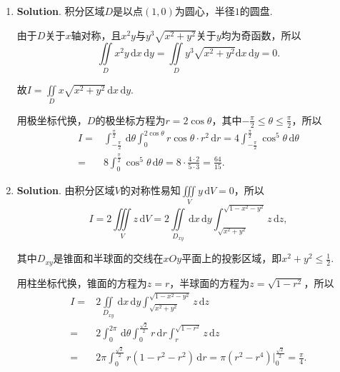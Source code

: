 \documentclass[../main.tex]{subfiles}
\begin{document}
\begin{enumerate}
    \item \textbf{Solution}. 积分区域$D$是以点$(1,0)$为圆心，半径$1$的圆盘.

          由于$D$关于$x$轴对称，且$x^{2}y$与$y^{3}\sqrt{x^{2}+y^{2}}$关于$y$均为奇函数，所以
          \[
              \iint\limits_{D}x^{2} y\,\mathrm{d}x\,\mathrm{d}y=\iint\limits_{D}y^{3}\sqrt{x^{2}+y^{2}}
              \mathrm{d}x\,\mathrm{d}y=0.
          \]

          故$I=\iint\limits_{D}x\sqrt{x^{2}+y^{2}}\,\mathrm{d}x\,\mathrm{d}y$.

          用极坐标代换，$D$的极坐标方程为$r=2\cos \theta$，其中$-\frac{\pi}{2}\leq \theta
              \leq \frac{\pi}{2}$，所以
          \[
              \begin{aligned}
                  I = {} & \int_{-\frac{\pi}{2}}^{\frac{\pi}{2}}\,\mathrm{d}\theta\int_{0}^{2\cos\theta}r\cos\theta\cdot r^{2}\,\mathrm{d}r = 4\int_{-\frac{\pi}{2}}^{\frac{\pi}{2}}\cos^{5}\theta\,\mathrm{d}\theta \\
                  = {}   & 8\int_{0}^{\frac{\pi}{2}}\cos^{5}\theta\,\mathrm{d}\theta = 8\cdot\frac{4\cdot2}{5\cdot3}=\frac{64}{15}.
              \end{aligned}
          \]

    \item \textbf{Solution}. 由积分区域$V$的对称性易知$\iiint\limits_{V}y\,\mathrm{d}
              V=0$，所以
          \[
              I = 2\iiint\limits_{V}z\,\mathrm{d}V = 2\iint\limits_{D_{xy}}\,\mathrm{d}x\,\mathrm{d}
              y\int_{\sqrt{x^{2}+y^{2}}}^{\sqrt{1-x^{2}-y^{2}}}z\,\mathrm{d}z,
          \]

          其中$D_{xy}$是锥面和半球面的交线在$xOy$平面上的投影区域，即$x^{2}+y^{2}\leq
              \frac{1}{2}$.

          用柱坐标代换，锥面的方程为$z=r$，半球面的方程为$z=\sqrt{1-r^{2}}$，所以
          \[
              \begin{aligned}
                  I = {} & 2\iint\limits_{D_{xy}}\,\mathrm{d}x\,\mathrm{d}y\int_{\sqrt{x^2+y^2}}^{\sqrt{1-x^2-y^2}}z\,\mathrm{d}z                          \\
                  = {}   & 2\int_{0}^{2\pi}\,\mathrm{d}\theta \int_{0}^{\frac{\sqrt{2}}{2}}r\,\mathrm{d}r\int_{r}^{\sqrt{1-r^2}}z\,\mathrm{d}z             \\
                  = {}   & 2\pi\int_{0}^{\frac{\sqrt{2}}{2}}r(1-r^{2}-r^{2})\,\mathrm{d}r = \pi(r^{2}-r^{4})\Bigg|_{0}^{\frac{\sqrt{2}}{2}}=\frac{\pi}{4}.
              \end{aligned}
          \]
\end{enumerate}
\end{document}
